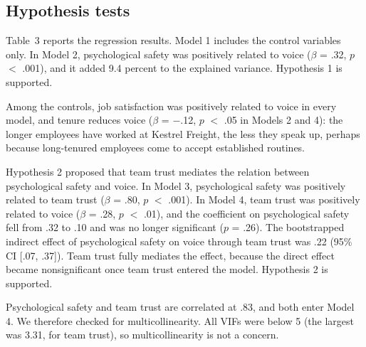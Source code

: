 \documentclass[11pt]{article}
\begin{document}
\subsection{Hypothesis tests}

Table~3 reports the regression results. Model 1 includes the control variables only. In Model 2, psychological safety was positively related to voice ($\beta$ = .32, $p$ $<$ .001), and it added 9.4 percent to the explained variance. Hypothesis 1 is supported.

Among the controls, job satisfaction was positively related to voice in every model, and tenure reduces voice ($\beta$ = $-$.12, $p$ $<$ .05 in Models 2 and 4): the longer employees have worked at Kestrel Freight, the less they speak up, perhaps because long-tenured employees come to accept established routines.

Hypothesis 2 proposed that team trust mediates the relation between psychological safety and voice. In Model 3, psychological safety was positively related to team trust ($\beta$ = .80, $p$ $<$ .001). In Model 4, team trust was positively related to voice ($\beta$ = .28, $p$ $<$ .01), and the coefficient on psychological safety fell from .32 to .10 and was no longer significant ($p$ = .26). The bootstrapped indirect effect of psychological safety on voice through team trust was .22 (95\% CI [.07, .37]). Team trust fully mediates the effect, because the direct effect became nonsignificant once team trust entered the model. Hypothesis 2 is supported.

Psychological safety and team trust are correlated at .83, and both enter Model 4. We therefore checked for multicollinearity. All VIFs were below 5 (the largest was 3.31, for team trust), so multicollinearity is not a concern.
\end{document}

